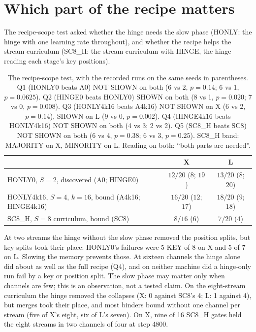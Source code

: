 \documentclass[11pt]{article}
\newcommand{\arm}[1]{\textsf{#1}}
\begin{document}
\section{Which part of the recipe matters}
\label{sec:scope}

The recipe-scope test asked whether the hinge needs the slow phase (\arm{HONLY}: the hinge with one learning rate throughout), and whether the recipe helps the stream curriculum (\arm{SC8\_H}: the stream curriculum with HINGE, the hinge reading each stage's key positions).

\begin{table}[h]
\centering
\small
\begin{tabular}{@{}lcc@{}}
\toprule
 & X & L\\
\midrule
\arm{HONLY0}, $S{=}2$, discovered (\arm{A0}; \arm{HINGE0}) & $12/20$ ($8$; $19$) & $13/20$ ($8$; $20$)\\
\arm{HONLY4k16}, $S{=}4$, $k{=}16$, bound (\arm{A4k16}; \arm{HINGE4k16}) & $16/20$ ($12$; $17$) & $18/20$ ($9$; $18$)\\
\arm{SC8\_H}, $S{=}8$ curriculum, bound (\arm{SC8}) & $8/16$ ($6$) & $7/20$ ($4$)\\
\bottomrule
\end{tabular}
\caption{The recipe-scope test, with the recorded runs on the same seeds in parentheses. Q1 (\arm{HONLY0} beats \arm{A0}) NOT SHOWN on both (6 vs 2, $p = 0.14$; 6 vs 1, $p = 0.0625$). Q2 (\arm{HINGE0} beats \arm{HONLY0}) SHOWN on both (8 vs 1, $p = 0.020$; 7 vs 0, $p = 0.008$). Q3 (\arm{HONLY4k16} beats \arm{A4k16}) NOT SHOWN on X (6 vs 2, $p = 0.14$), SHOWN on L (9 vs 0, $p = 0.002$). Q4 (\arm{HINGE4k16} beats \arm{HONLY4k16}) NOT SHOWN on both (4 vs 3; 2 vs 2). Q5 (\arm{SC8\_H} beats \arm{SC8}) NOT SHOWN on both (6 vs 4, $p = 0.38$; 6 vs 3, $p = 0.25$). \arm{SC8\_H} band: MAJORITY on X, MINORITY on L. Reading on both: ``both parts are needed''.}
\label{tab:scope}
\end{table}

\noindent
At two streams the hinge without the slow phase removed the position splits, but key splits took their place: \arm{HONLY0}'s failures were 5 KEY of 8 on X and 5 of 7 on L. Slowing the memory prevents those. At sixteen channels the hinge alone did about as well as the full recipe (Q4), and on neither machine did a hinge-only run fail by a key or position split. The slow phase may matter only when channels are few; this is an observation, not a tested claim. On the eight-stream curriculum the hinge removed the collapses (X: 0 against \arm{SC8}'s 4; L: 1 against 4), but merges took their place, and most binders bound without one channel per stream (five of X's eight, six of L's seven). On X, nine of 16 \arm{SC8\_H} gates held the eight streams in two channels of four at step 4800.
\end{document}
